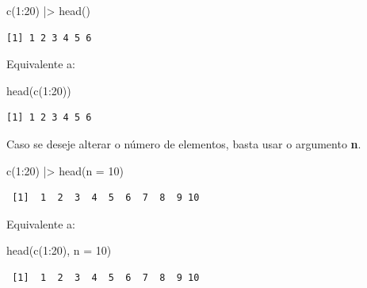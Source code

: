 \documentclass[
  letterpaper,
  DIV=11,
  numbers=noendperiod]{scrreprt}
\newenvironment{Shaded}{\begin{snugshade}}{\end{snugshade}}
\newcommand{\AttributeTok}[1]{\textcolor[rgb]{0.40,0.45,0.13}{#1}}
\newcommand{\DecValTok}[1]{\textcolor[rgb]{0.68,0.00,0.00}{#1}}
\newcommand{\FunctionTok}[1]{\textcolor[rgb]{0.28,0.35,0.67}{#1}}
\newcommand{\NormalTok}[1]{\textcolor[rgb]{0.00,0.23,0.31}{#1}}
\newcommand{\SpecialCharTok}[1]{\textcolor[rgb]{0.37,0.37,0.37}{#1}}
\begin{document}
\begin{Shaded}
\begin{Highlighting}[]
\FunctionTok{c}\NormalTok{(}\DecValTok{1}\SpecialCharTok{:}\DecValTok{20}\NormalTok{) }\SpecialCharTok{|\textgreater{}} \FunctionTok{head}\NormalTok{()}
\end{Highlighting}
\end{Shaded}

\begin{verbatim}
[1] 1 2 3 4 5 6
\end{verbatim}

Equivalente a:

\begin{Shaded}
\begin{Highlighting}[]
\FunctionTok{head}\NormalTok{(}\FunctionTok{c}\NormalTok{(}\DecValTok{1}\SpecialCharTok{:}\DecValTok{20}\NormalTok{))}
\end{Highlighting}
\end{Shaded}

\begin{verbatim}
[1] 1 2 3 4 5 6
\end{verbatim}

Caso se deseje alterar o número de elementos, basta usar o argumento
\textbf{n}.

\begin{Shaded}
\begin{Highlighting}[]
\FunctionTok{c}\NormalTok{(}\DecValTok{1}\SpecialCharTok{:}\DecValTok{20}\NormalTok{) }\SpecialCharTok{|\textgreater{}} \FunctionTok{head}\NormalTok{(}\AttributeTok{n =} \DecValTok{10}\NormalTok{)}
\end{Highlighting}
\end{Shaded}

\begin{verbatim}
 [1]  1  2  3  4  5  6  7  8  9 10
\end{verbatim}

Equivalente a:

\begin{Shaded}
\begin{Highlighting}[]
\FunctionTok{head}\NormalTok{(}\FunctionTok{c}\NormalTok{(}\DecValTok{1}\SpecialCharTok{:}\DecValTok{20}\NormalTok{), }\AttributeTok{n =} \DecValTok{10}\NormalTok{)}
\end{Highlighting}
\end{Shaded}

\begin{verbatim}
 [1]  1  2  3  4  5  6  7  8  9 10
\end{verbatim}
\end{document}
